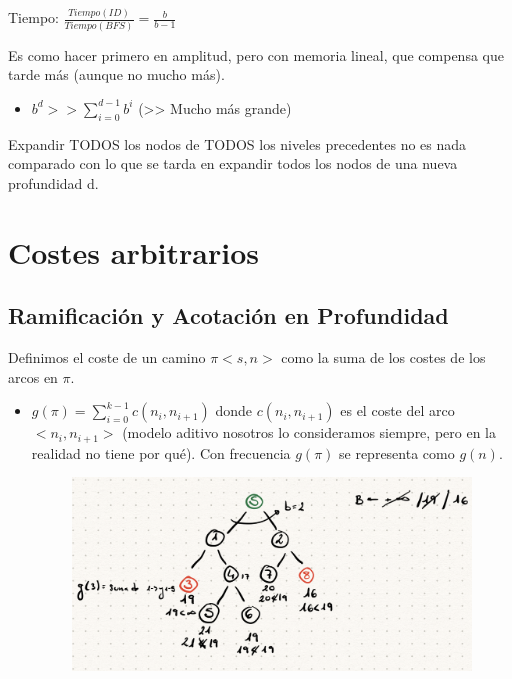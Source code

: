 \documentclass[12pt, twoside, openright]{report} %
\begin{document}
	Tiempo: \(\frac {Tiempo (ID)} {Tiempo(BFS)} =\frac {b} {b-1}\)

	Es como hacer primero en amplitud, pero con memoria lineal, que
    compensa que tarde más (aunque no mucho más).

    \begin{itemize}
  
    \item
      \(b^d >> \sum _{i=0}^{d-1} b^i\) (\textgreater\textgreater{} Mucho
      más grande)
    \end{itemize}

	Expandir TODOS los nodos de TODOS los niveles precedentes no es nada
    comparado con lo que se tarda en expandir todos los nodos de una
    nueva profundidad d.

	
\section{Costes arbitrarios}
\subsection{Ramificación y Acotación en Profundidad}


    Definimos el coste de un camino \(\pi<s,n>\) como la suma de los
    costes de los arcos en \(\pi\).

    \begin{itemize}
    \item
      \(g(\pi)= \sum_{i=0}^{k-1} c(n_i,n_{i+1})\) donde
      \(c(n_i,n_{i+1})\) es el coste del arco \(<n_i,n_{i+1}>\) (modelo
      aditivo nosotros lo consideramos siempre, pero en la realidad no
      tiene por qué). Con frecuencia \(g(\pi)\) se representa como
      \(g(n)\).
	  \begin{figure}[H]
		{\includegraphics[scale=.3]{Untitled 51.png}}
	\end{figure}
    \end{itemize}
\end{document}
